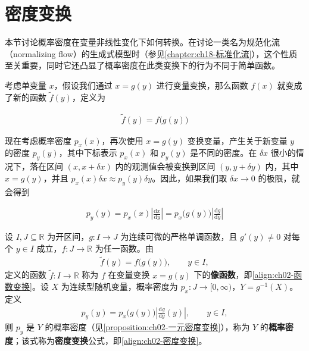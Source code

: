 \documentclass[../../main.tex]{subfiles}
\begin{document}
\section{密度变换}\label{section:ch02-密度变换}

本节讨论概率密度在变量非线性变化下如何转换。在讨论一类名为规范化流（normalizing flow）的生成式模型时（参见\cref{chapter:ch18-标准化流}），这个性质至关重要，同时它还凸显了概率密度在此类变换下的行为不同于简单函数。

考虑单变量 $x$，假设我们通过 $x=g(y)$ 进行变量变换，那么函数 $f(x)$ 就变成了新的函数 $\tilde{f}(y)$，定义为

\begin{align}
  \tilde{f}(y) = f\big(g(y)\big)
  \label{align:ch02-函数变换}
\end{align}

现在考虑概率密度 $p_x(x)$，再次使用 $x=g(y)$ 变换变量，产生关于新变量 $y$ 的密度 $p_y(y)$，其中下标表示 $p_x(x)$ 和 $p_y(y)$ 是不同的密度。在 $\delta x$ 很小的情况下，落在区间 $(x,x+\delta x)$ 内的观测值会被变换到区间 $(y,y+\delta y)$ 内，其中 $x=g(y)$，并且 $p_x(x)\delta x\approx p_y(y)\delta y$。因此，如果我们取 $\delta x\to0$ 的极限，就会得到

\begin{align}
  p_y(y) = p_x(x)\left|\frac{\mathrm{d}x}{\mathrm{d}y}\right| = p_x\big(g(y)\big)\left|\frac{\mathrm{d}g}{\mathrm{d}y}\right|
  \label{align:ch02-密度变换}
\end{align}

\begin{definition}[变量变换与密度变换]\label{definition:ch02-密度变换}
设 $I,J\subseteq\mathbb{R}$ 为开区间，$g:I\to J$ 为连续可微的严格单调函数，且 $g'(y)\neq0$ 对每个 $y\in I$ 成立，$f:J\to\mathbb{R}$ 为任一函数。由
\begin{align*}
  \tilde{f}(y)=f\big(g(y)\big),\qquad y\in I,
\end{align*}
定义的函数 $\tilde{f}:I\to\mathbb{R}$ 称为 $f$ 在变量变换 $x=g(y)$ 下的\textbf{像函数}，即\eqref{align:ch02-函数变换}。设 $X$ 为连续型随机变量，概率密度为 $p_x:J\to[0,\infty)$，$Y=g^{-1}(X)$。定义
\begin{align*}
  p_y(y)=p_x\big(g(y)\big)\left|\frac{\mathrm{d}g}{\mathrm{d}y}(y)\right|,\qquad y\in I,
\end{align*}
则 $p_y$ 是 $Y$ 的概率密度（见\cref{proposition:ch02-一元密度变换}），称为 $Y$ 的\textbf{概率密度}；该式称为\textbf{密度变换}公式，即\eqref{align:ch02-密度变换}。
\end{definition}
\end{document}
